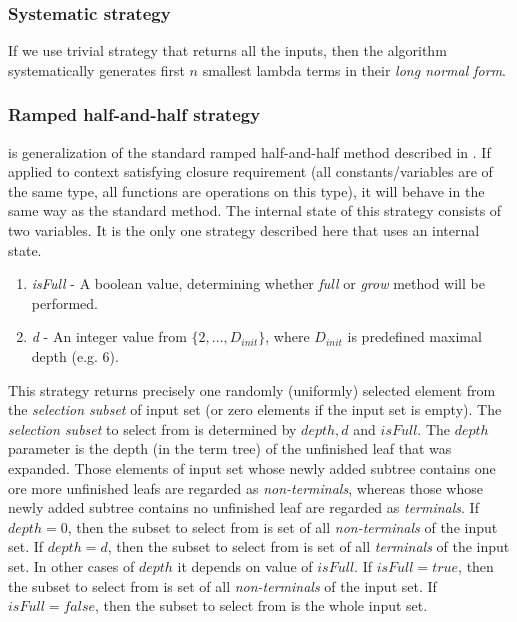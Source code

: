\documentclass[conference]{IEEEtran}
\newcommand{\setDots}[2]{ \lbrace #1 , \dots , #2 \rbrace}
\begin{document}
\subsubsection{Systematic strategy}

If we use trivial strategy that returns all the inputs, 
then the algorithm systematically generates 
first $n$ smallest lambda terms in their
\textit{long normal form}.

\subsubsection{Ramped half-and-half strategy}
is generalization of the standard ramped half-and-half method described 
in \cite{koza92}. If applied to context satisfying closure requirement
(all constants/variables are of the same type, all functions are operations
on this type), it will behave in the same way as the standard method.
The internal state of this strategy consists of two variables.
It is the only one strategy described here that uses an internal state.

\begin{enumerate}
 \item \textit{isFull} - A boolean value, determining whether \textit{full}
                     or \textit{grow} method will be performed.
 \item \textit{d} - An integer value from $\setDots{2}{D_{init}}$, where 
                $D_{init}$ is predefined maximal depth (e.g. 6).                    
\end{enumerate}

This strategy returns precisely one randomly
(uniformly) selected  element from 
the \textit{selection subset} of input set
(or zero elements if the input set is empty). 
The \textit{selection subset} 
to select from is determined by $depth, d$ and $isFull$.
The $depth$ parameter is the depth (in the term tree) 
of the unfinished leaf that was expanded.
Those elements of input set whose newly added subtree contains one ore more 
unfinished leafs are regarded as \textit{non-terminals}, whereas 
those whose newly added subtree contains no unfinished leaf are regarded as 
\textit{terminals}.
If $depth = 0$, then the subset to select from is  
set of all \textit{non-terminals} of the input set.
If $depth = d$, then the subset to select from is
set of all \textit{terminals} of the input set.
In other cases of $depth$ it depends on value of $isFull$.
If $isFull = true$, then the subset to select from is 
set of all \textit{non-terminals} of the input set.
If $isFull = false$, then the subset to select from is 
the whole input set.
\end{document}
